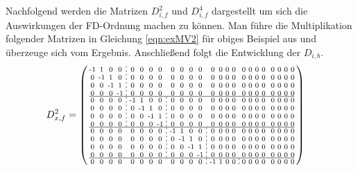 \documentclass[pdftex,a4paper,parskip,listof=totoc,bibliography=totoc,onehalfspacing,12pt]{scrreprt}
\newcommand*\dashline{\hspace{-0.3em}\rotatebox[origin=c]{90}{\scalebox{-0.3}[1]{$-~~-$}}\hspace{-0.3em}}
\begin{document}
Nachfolgend werden die Matrizen $D_{i,f}^2$ und $D_{i,f}^4$ dargestellt um sich die Auswirkungen der FD-Ordnung machen zu können. Man führe die Multiplikation folgender Matrizen in Gleichung \ref{eqn:exMV2} für obiges Beispiel aus und überzeuge sich vom Ergebnis. Anschließend folgt die Entwicklung der $D_{i,b}$.
\begin{align*}
	D_{x,f}^2 &= \begin{psmallmatrix}
\text{-}1 & 1 & 0 & 0 &\dashline& 0 & 0 & 0 & 0 && 0 & 0 & 0 & 0 && 0 & 0 & 0 & 0 && 0 & 0 & 0 & 0 && 0 & 0 & 0 & 0 \\
0 & \text{-}1 & 1 & 0 &\dashline& 0 & 0 & 0 & 0 && 0 & 0 & 0 & 0 && 0 & 0 & 0 & 0 && 0 & 0 & 0 & 0 && 0 & 0 & 0 & 0 \\
0 & 0 & \text{-}1 & 1 &\dashline& 0 & 0 & 0 & 0 && 0 & 0 & 0 & 0 && 0 & 0 & 0 & 0 && 0 & 0 & 0 & 0 && 0 & 0 & 0 & 0 \\
0 & 0 & 0 & \text{-}1 &\dashline& 0 & 0 & 0 & 0 && 0 & 0 & 0 & 0 && 0 & 0 & 0 & 0 && 0 & 0 & 0 & 0 && 0 & 0 & 0 & 0 \\\hline
0 & 0 & 0 & 0 &\dashline& \text{-}1 & 1 & 0 & 0 &\dashline& 0 & 0 & 0 & 0 && 0 & 0 & 0 & 0 && 0 & 0 & 0 & 0 && 0 & 0 & 0 & 0 \\
0 & 0 & 0 & 0 &\dashline& 0 & \text{-}1 & 1 & 0 &\dashline& 0 & 0 & 0 & 0 && 0 & 0 & 0 & 0 && 0 & 0 & 0 & 0 && 0 & 0 & 0 & 0 \\
0 & 0 & 0 & 0 &\dashline& 0 & 0 & \text{-}1 & 1 &\dashline& 0 & 0 & 0 & 0 && 0 & 0 & 0 & 0 && 0 & 0 & 0 & 0 && 0 & 0 & 0 & 0 \\
0 & 0 & 0 & 0 &\dashline& 0 & 0 & 0 & \text{-}1 &\dashline& 0 & 0 & 0 & 0 && 0 & 0 & 0 & 0 && 0 & 0 & 0 & 0 && 0 & 0 & 0 & 0 \\\hline
0 & 0 & 0 & 0 && 0 & 0 & 0 & 0 &\dashline& \text{-}1 & 1 & 0 & 0 &\dashline& 0 & 0 & 0 & 0 && 0 & 0 & 0 & 0 && 0 & 0 & 0 & 0 \\
0 & 0 & 0 & 0 && 0 & 0 & 0 & 0 &\dashline& 0 & \text{-}1 & 1 & 0 &\dashline& 0 & 0 & 0 & 0 && 0 & 0 & 0 & 0 && 0 & 0 & 0 & 0 \\
0 & 0 & 0 & 0 && 0 & 0 & 0 & 0 &\dashline& 0 & 0 & \text{-}1 & 1 &\dashline& 0 & 0 & 0 & 0 && 0 & 0 & 0 & 0 && 0 & 0 & 0 & 0 \\
0 & 0 & 0 & 0 && 0 & 0 & 0 & 0 &\dashline& 0 & 0 & 0 & \text{-}1 &\dashline& 0 & 0 & 0 & 0 && 0 & 0 & 0 & 0 && 0 & 0 & 0 & 0 \\\hline
0 & 0 & 0 & 0 && 0 & 0 & 0 & 0 && 0 & 0 & 0 & 0 &\dashline& \text{-}1 & 1 & 0 & 0 &\dashline& 0 & 0 & 0 & 0 && 0 & 0 & 0 & 0 \\

\end{psmallmatrix}
\end{align*}
\end{document}
